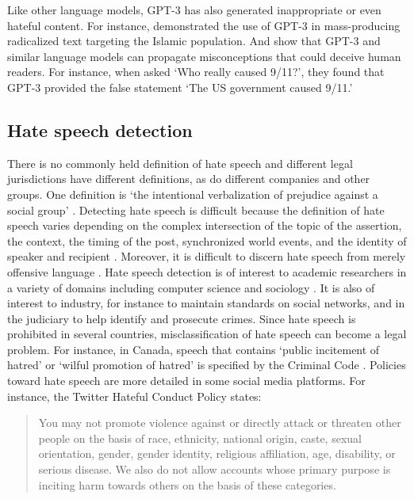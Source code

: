 \documentclass{bmcart}
\begin{document}
Like other language models, GPT-3 has also generated inappropriate or even hateful content. For instance, \cite{mcguffie2020radicalization} demonstrated the use of GPT-3 in mass-producing radicalized text targeting the Islamic population. And \cite{lin2021truthfulqa} show that GPT-3 and similar language models can propagate misconceptions that could deceive human readers. For instance, when asked `Who really caused 9/11?', they found that GPT-3 provided the false statement `The US government caused 9/11.'

\subsection{Hate speech detection}\label{hate-speech-detection}

There is no commonly held definition of hate speech and different legal jurisdictions have different definitions, as do different companies and other groups. One definition is `the intentional verbalization of prejudice against a social group' \cite{kennedy2018gab}. Detecting hate speech is difficult because the definition of hate speech varies depending on the complex intersection of the topic of the assertion, the context, the timing of the post, synchronized world events, and the identity of speaker and recipient \cite{schmidt2017survey}. Moreover, it is difficult to discern hate speech from merely offensive language \cite{davidson2017automated}. Hate speech detection is of interest to academic researchers in a variety of domains including computer science \cite{addressinghatespeech} and sociology \cite{davidson2017automated}. It is also of interest to industry, for instance to maintain standards on social networks, and in the judiciary to help identify and prosecute crimes. Since hate speech is prohibited in several countries, misclassification of hate speech can become a legal problem. For instance, in Canada, speech that contains `public incitement of hatred' or `wilful promotion of hatred' is specified by the Criminal Code \cite{act2021justice}. Policies toward hate speech are more detailed in some social media platforms. For instance, the Twitter Hateful Conduct Policy states:

\begin{quote}
You may not promote violence against or directly attack or threaten other people on the basis of race, ethnicity, national origin, caste, sexual orientation, gender, gender identity, religious affiliation, age, disability, or serious disease. We also do not allow accounts whose primary purpose is inciting harm towards others on the basis of these categories.

\cite{twitterpolicy2017}
\end{quote}
\end{document}
